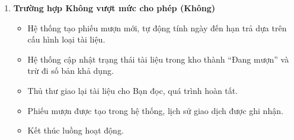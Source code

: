 \begin{enumerate}
\begin{itemize}
        \item Kết thúc luồng hoạt động.
    \end{itemize}

    \item \textbf{Trường hợp Không vượt mức cho phép (Không)}
    \begin{itemize}
        \item Hệ thống tạo phiếu mượn mới, tự động tính ngày đến hạn trả dựa trên cấu hình loại tài liệu.
        
        \item Hệ thống cập nhật trạng thái tài liệu trong kho thành ``Đang mượn'' và trừ đi số bản khả dụng.
        
        \item Thủ thư giao lại tài liệu cho Bạn đọc, quá trình hoàn tất.
        
        \item Phiếu mượn được tạo trong hệ thống, lịch sử giao dịch được ghi nhận.
        
        \item Kết thúc luồng hoạt động.
    \end{itemize}
\end{enumerate}

